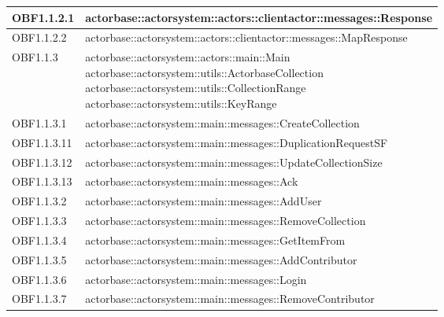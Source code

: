\documentclass{scalatekids-article}
\begin{document}
\begin{longtable}[H]{|p{4.5cm}|p{13cm}|}
  \hline
  OBF1.1.2.1 & \multiLineCell[t]{actorbase::actorsystem::actors::clientactor::messages::Response\\}\\
  \hline
  OBF1.1.2.2 & \multiLineCell[t]{actorbase::actorsystem::actors::clientactor::messages::MapResponse\\}\\
  \hline
  OBF1.1.3 & \multiLineCell[t]{actorbase::actorsystem::actors::main::Main\\actorbase::actorsystem::utils::ActorbaseCollection\\actorbase::actorsystem::utils::CollectionRange\\actorbase::actorsystem::utils::KeyRange\\}\\
  \hline
  OBF1.1.3.1 & \multiLineCell[t]{actorbase::actorsystem::main::messages::CreateCollection\\}\\
  \hline
  OBF1.1.3.11 & \multiLineCell[t]{actorbase::actorsystem::main::messages::DuplicationRequestSF\\}\\
  \hline
  OBF1.1.3.12 & \multiLineCell[t]{actorbase::actorsystem::main::messages::UpdateCollectionSize\\}\\
  \hline
  OBF1.1.3.13 & \multiLineCell[t]{actorbase::actorsystem::main::messages::Ack\\}\\
  \hline
  OBF1.1.3.2 & \multiLineCell[t]{actorbase::actorsystem::main::messages::AddUser\\}\\
  \hline
  OBF1.1.3.3 & \multiLineCell[t]{actorbase::actorsystem::main::messages::RemoveCollection\\}\\
  \hline
  OBF1.1.3.4 & \multiLineCell[t]{actorbase::actorsystem::main::messages::GetItemFrom\\}\\
  \hline
  OBF1.1.3.5 & \multiLineCell[t]{actorbase::actorsystem::main::messages::AddContributor\\}\\
  \hline
  OBF1.1.3.6 & \multiLineCell[t]{actorbase::actorsystem::main::messages::Login\\}\\
  \hline
  OBF1.1.3.7 & \multiLineCell[t]{actorbase::actorsystem::main::messages::RemoveContributor\\}\\

\end{longtable}
\end{document}
